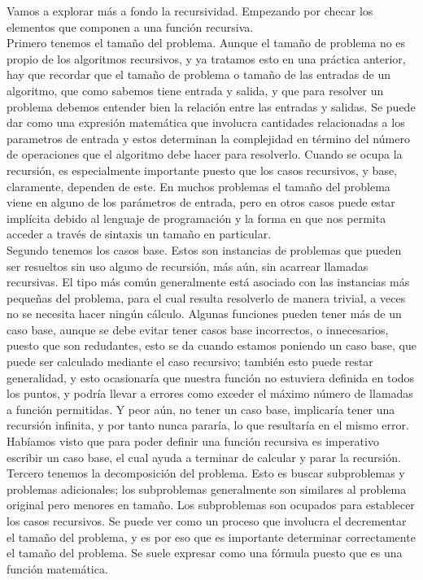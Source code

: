 \documentclass[12pt,twoside]{article}
\begin{document}
Vamos a explorar más a fondo la recursividad. Empezando por checar los elementos que componen a una función recursiva.
\newline
\\ Primero tenemos el tamaño del problema. Aunque el tamaño de problema no es propio de los algoritmos recursivos, y ya tratamos esto en una práctica anterior, hay que recordar que el tamaño de problema o tamaño de las entradas de un algoritmo, que como sabemos tiene entrada y salida, y que para resolver un problema debemos entender bien la relación entre las entradas y salidas. Se puede dar como una expresión matemática que involucra cantidades relacionadas a los parametros de entrada y estos determinan la complejidad en término del número de operaciones que el algoritmo debe hacer para resolverlo. Cuando se ocupa la recursión, es especialmente importante puesto que los casos recursivos, y base, claramente, dependen de este. En muchos problemas el tamaño del problema viene en alguno de los parámetros de entrada, pero en otros casos puede estar implícita debido al lenguaje de programación y la forma en que nos permita acceder a través de sintaxis un tamaño en particular.
\newline
\\ Segundo tenemos los casos base. Estos son instancias de problemas que pueden ser resueltos sin uso alguno de recursión, más aún, sin acarrear llamadas recursivas. El tipo más común generalmente está asociado con las instancias más pequeñas del problema, para el cual resulta resolverlo de manera trivial, a veces no se necesita hacer ningún cálculo. Algunas funciones pueden tener más de un caso base, aunque se debe evitar tener casos base incorrectos, o innecesarios, puesto que son redudantes, esto se da cuando estamos poniendo un caso base, que puede ser calculado mediante el caso recursivo; también esto puede restar generalidad, y esto ocasionaría que nuestra función no estuviera definida en todos los puntos, y podría llevar a errores como exceder el máximo número de llamadas a función permitidas. Y peor aún, no tener un caso base, implicaría tener una recursión infinita, y por tanto nunca pararía, lo que resultaría en el mismo error. Habíamos visto que para poder definir una función recursiva es imperativo escribir un caso base, el cual ayuda a terminar de calcular y parar la recursión.
\newline
\\ Tercero tenemos la decomposición del problema. Esto es buscar subproblemas y problemas adicionales; los subproblemas generalmente son similares al problema original pero menores en tamaño. Los subproblemas son ocupados para establecer los casos recursivos. Se puede ver como un proceso que involucra el decrementar el tamaño del problema, y es por eso que es importante determinar correctamente el tamaño del problema. Se suele expresar como una fórmula puesto que es una función matemática.
\end{document}
